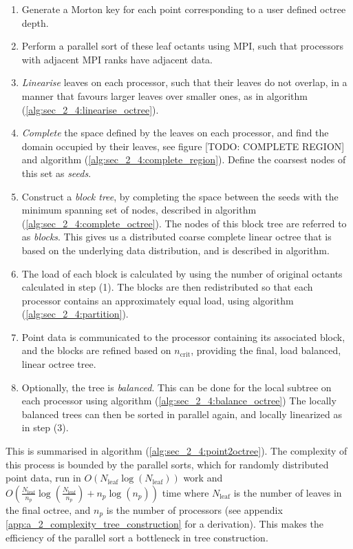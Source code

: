 \begin{enumerate}
    \item Generate a Morton key for each point corresponding to a user defined octree depth.
    \item Perform a parallel sort of these leaf octants using MPI, such that processors with adjacent MPI ranks have adjacent data.
    \item \textit{Linearise} leaves on each processor, such that their leaves do not overlap, in a manner that favours larger leaves over smaller ones, as in algorithm (\ref{alg:sec_2_4:linearise_octree}). 
    \item \textit{Complete} the space defined by the leaves on each processor, and find the domain occupied by their leaves, see figure [TODO: COMPLETE REGION] and algorithm (\ref{alg:sec_2_4:complete_region}). Define the coarsest nodes of this set as \textit{seeds}.
    \item Construct a \textit{block tree}, by completing the space between the seeds with the minimum spanning set of nodes, described in algorithm (\ref{alg:sec_2_4:complete_octree}). The nodes of this block tree are referred to as \textit{blocks}. This gives us a distributed coarse complete linear octree that is based on the underlying data distribution, and is described in algorithm.
    \item The load of each block is calculated by using the number of original octants calculated in step (1). The blocks are then redistributed so that each processor contains an approximately equal load, using algorithm (\ref{alg:sec_2_4:partition}).
    \item Point data is communicated to the processor containing its associated block, and the blocks are refined based on $n_{\text{crit}}$, providing the final, load balanced, linear octree tree.
    \item Optionally, the tree is \textit{balanced}. This can be done for the local subtree on each processor using algorithm (\ref{alg:sec_2_4:balance_octree}) The locally balanced trees can then be sorted in parallel again, and locally linearized as in step (3).
\end{enumerate}

This is summarised in algorithm (\ref{alg:sec_2_4:point2octree}). The complexity of this process is bounded by the parallel sorts, which for randomly distributed point data, run in $O(N_{\text{leaf}} \log (N_{\text{leaf}}))$ work and $O(\frac{N_{\text{leaf}}}{n_p} \log(\frac{N_{\text{leaf}}}{n_p}) + n_p \log (n_p))$ time where $N_{\text{leaf}}$ is the number of leaves in the final octree, and $n_p$ is the number of processors (see appendix \ref{app:a_2_complexity_tree_construction} for a derivation). This makes the efficiency of the parallel sort a bottleneck in tree construction.

